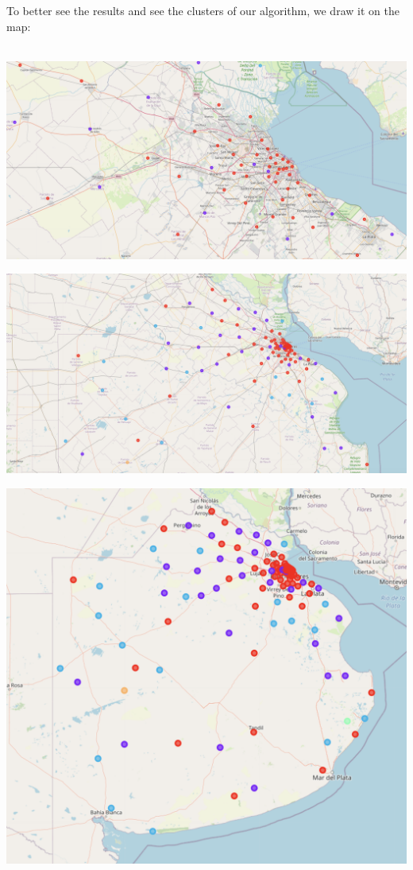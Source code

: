 \documentclass[12pt,a4paper]{tesis}
\begin{document}
To better see the results and see the clusters of our algorithm, we draw it on the map: \\ \\

\centerline{
	\includegraphics[scale=0.3]{mapa5}
}

\centerline{
	\includegraphics[scale=0.3]{mapa6}
}

\centerline{
	\includegraphics[scale=0.3]{mapa7}
}
\end{document}
